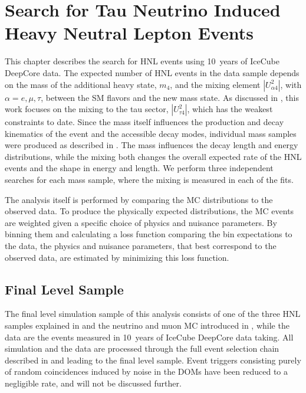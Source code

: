 \setchapterpreamble[u]{\margintoc}

\chapter{Search for Tau Neutrino Induced Heavy Neutral Lepton Events}

This chapter describes the search for HNL events using \SI{10}{years} of IceCube DeepCore data. The expected number of HNL events in the data sample depends on the mass of the additional heavy state, $m_4$, and the mixing element $|U_{\alpha4}^2|$, with $\alpha=e,\mu,\tau$, between the SM flavors and the new mass state. As discussed in , this work focuses on the mixing to the tau sector, $|U_{\tau4}^2|$, which has the weakest constraints to date. Since the mass itself influences the production and decay kinematics of the event and the accessible decay modes, individual mass samples were produced as described in . The mass influences the decay length and energy distributions, while the mixing both changes the overall expected rate of the HNL events and the shape in energy and length. We perform three independent searches for each mass sample, where the mixing is measured in each of the fits.

The analysis itself is performed by comparing the MC distributions to the observed data. To produce the  physically expected distributions, the MC events are weighted given a specific choice of physics  and nuisance parameters. By binning them and calculating a loss function comparing the bin expectations to the data, the physics and nuisance parameters, that best correspond to the observed data, are estimated by minimizing this loss function.


\section{Final Level Sample} 

The final level simulation sample of this analysis consists of one of the three HNL samples explained in  and the neutrino and muon MC introduced in , while the data are the events measured in \SI{10}{years} of IceCube DeepCore data taking. All simulation and the data are processed through the full event selection chain described in  and  leading to the final level sample. Event triggers consisting purely of random coincidences induced by noise in the DOMs have been reduced to a negligible rate, and will not be discussed further.

